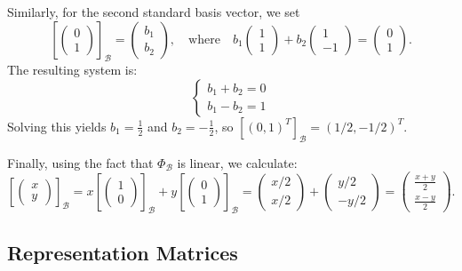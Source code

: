 \begin{example}
Similarly, for the second standard basis vector, we set
\[
\left[\begin{pmatrix} 0 \\ 1 \end{pmatrix}\right]_{\mathcal{B}} = \begin{pmatrix} b_1 \\ b_2 \end{pmatrix}, \quad \text{where} \quad b_1 \begin{pmatrix} 1 \\ 1 \end{pmatrix} + b_2 \begin{pmatrix} 1 \\ -1 \end{pmatrix} = \begin{pmatrix} 0 \\ 1 \end{pmatrix}.
\]
The resulting system is:
\[
\begin{cases}
b_1 + b_2 = 0 \\
b_1 - b_2 = 1
\end{cases}
\]
Solving this yields $b_1 = \frac{1}{2}$ and $b_2 = -\frac{1}{2}$, so $[(0, 1)^T]_{\mathcal{B}} = (1/2, -1/2)^T$.

Finally, using the fact that $\Phi_{\mathcal{B}}$ is linear, we calculate:
\[
\left[\begin{pmatrix} x \\ y \end{pmatrix}\right]_{\mathcal{B}} = x \left[\begin{pmatrix} 1 \\ 0 \end{pmatrix}\right]_{\mathcal{B}} + y \left[\begin{pmatrix} 0 \\ 1 \end{pmatrix}\right]_{\mathcal{B}} = \begin{pmatrix} x/2 \\ x/2 \end{pmatrix} + \begin{pmatrix} y/2 \\ -y/2 \end{pmatrix} = \begin{pmatrix} \frac{x+y}{2} \\ \frac{x-y}{2} \end{pmatrix}.
\]
\end{example}

\subsection{Representation Matrices}

